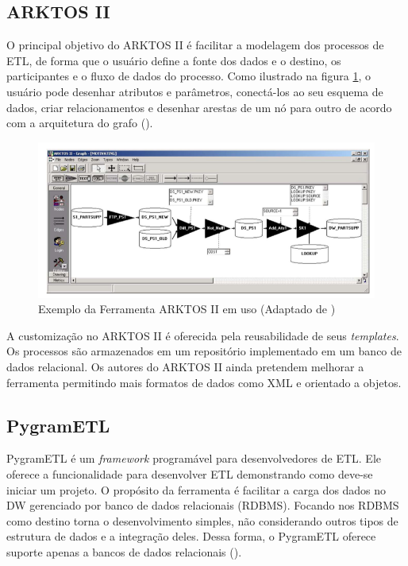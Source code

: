 \subsection{ARKTOS II}

O principal objetivo do ARKTOS II é facilitar a modelagem dos processos de ETL, de forma que o usuário define a fonte dos dados e o destino, os participantes e o fluxo de dados do processo. Como ilustrado na figura \ref{arktosii}, o usuário pode desenhar atributos e parâmetros, conectá-los ao seu esquema de dados, criar relacionamentos e desenhar arestas de um nó para outro de acordo com a arquitetura do grafo (\cite{vassiliadis:2005}).


\begin{figure}[h]
	\centering
	\includegraphics[scale=0.5]{fig/arktosii.png}
	\caption{Exemplo da Ferramenta ARKTOS II em uso (Adaptado de \cite{vassiliadis:2005})}
	\label{arktosii}
\end{figure}

A customização no ARKTOS II é oferecida pela reusabilidade de seus \textit{templates}. Os processos são armazenados em um repositório implementado em um banco de dados relacional. Os autores do ARKTOS II ainda pretendem melhorar a ferramenta permitindo mais formatos de dados como XML e orientado a objetos.


\subsection{PygramETL}

PygramETL é um \textit{framework} programável para desenvolvedores de ETL. Ele oferece a funcionalidade para desenvolver ETL demonstrando como deve-se iniciar um projeto. O propósito da ferramenta é facilitar a carga dos dados no DW gerenciado por banco de dados relacionais (RDBMS). Focando nos RDBMS como destino torna o desenvolvimento simples, não considerando outros tipos de estrutura de dados e a integração deles. Dessa forma, o PygramETL oferece suporte apenas a bancos de dados relacionais (\cite{thomsen:2009}).

